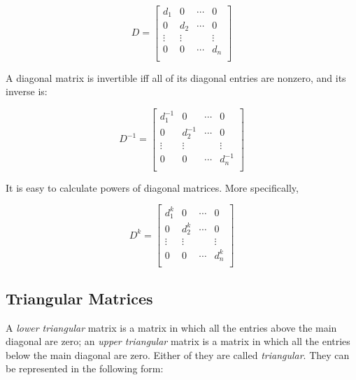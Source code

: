 \documentclass{report}
\begin{document}
		\begin{displaymath}
		D=
		\begin{bmatrix}
		d_1 & 0 & \cdots & 0 \\
		0 & d_2 & \cdots & 0 \\
		\vdots & \vdots &        & \vdots \\
		0 & 0 & \cdots & d_n \\
		\end{bmatrix}
		\end{displaymath}
		
		A diagonal matrix is invertible iff all of its diagonal entries are nonzero, and its inverse is:
		
		\begin{displaymath}
		D^{-1}=
		\begin{bmatrix}
		d_1^{-1} & 0 & \cdots & 0 \\
		0 & d_2^{-1} & \cdots & 0 \\
		\vdots & \vdots &        & \vdots \\
		0 & 0 & \cdots & d_n^{-1} \\
		\end{bmatrix}
		\end{displaymath}
		
		It is easy to calculate powers of diagonal matrices. More specifically,
		
		\begin{displaymath}
		D^{k}=
		\begin{bmatrix}
		d_1^{k} & 0 & \cdots & 0 \\
		0 & d_2^{k} & \cdots & 0 \\
		\vdots & \vdots &        & \vdots \\
		0 & 0 & \cdots & d_n^{k} \\
		\end{bmatrix}
		\end{displaymath}
		
		\subsection{Triangular Matrices}
		A \emph{lower triangular} matrix is a matrix in which all the entries above the main diagonal are zero; an \emph{upper triangular} matrix is a matrix in which all the entries below the main diagonal are zero. Either of they are called \emph{triangular}. They can be represented in the following form:
		
\end{document}
